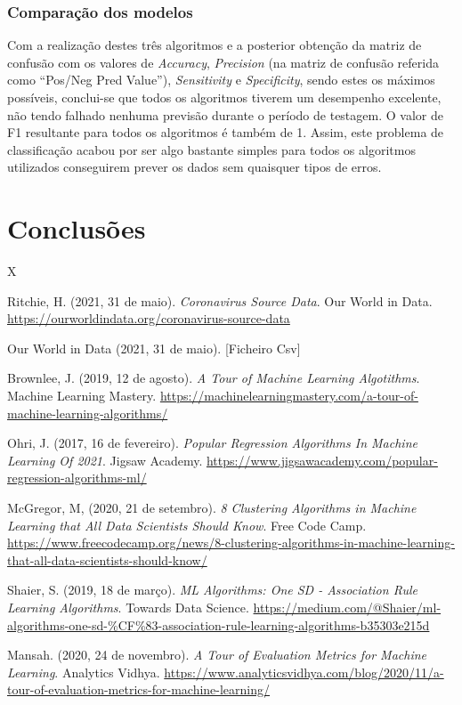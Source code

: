 \documentclass[conference]{IEEEtran}
\begin{document}
\subsubsection{Comparação dos modelos}
Com a realização destes três algoritmos e a posterior obtenção da matriz de confusão com os valores de \textit{Accuracy}, \textit{Precision} (na matriz de confusão referida como “Pos/Neg Pred Value”), \textit{Sensitivity} e \textit{Specificity}, sendo estes os máximos possíveis, conclui-se que todos os algoritmos tiverem um desempenho excelente, não tendo falhado nenhuma previsão durante o período de testagem. O valor de F1 resultante para todos os algoritmos é também de 1.
Assim, este problema de classificação acabou por ser algo bastante simples para todos os algoritmos utilizados conseguirem prever os dados sem quaisquer tipos de erros.




\section{Conclusões} %
X

\begin{thebibliography}{00}

 Ritchie, H. (2021, 31 de maio). \textit{Coronavirus Source Data}. Our World in Data. \url{https://ourworldindata.org/coronavirus-source-data}

 Our World in Data (2021, 31 de maio). [Ficheiro Csv]

 Brownlee, J. (2019, 12 de agosto). \textit{A Tour of Machine Learning Algotithms}. Machine Learning Mastery. \url{https://machinelearningmastery.com/a-tour-of-machine-learning-algorithms/}

 Ohri, J. (2017, 16 de fevereiro). \textit{Popular Regression Algorithms In Machine Learning Of 2021}. Jigsaw Academy. \url{https://www.jigsawacademy.com/popular-regression-algorithms-ml/}

 McGregor, M, (2020, 21 de setembro). \textit{8 Clustering Algorithms in Machine Learning that All Data Scientists Should Know}. Free Code Camp. \url{https://www.freecodecamp.org/news/8-clustering-algorithms-in-machine-learning-that-all-data-scientists-should-know/ }

 Shaier, S. (2019, 18 de março). \textit{ML Algorithms: One SD - Association Rule Learning Algorithms}. Towards Data Science. \url{https://medium.com/@Shaier/ml-algorithms-one-sd-%CF%83-association-rule-learning-algorithms-b35303e215d}

 Mansah. (2020, 24 de novembro). \textit{A Tour of Evaluation Metrics for Machine Learning}. Analytics Vidhya. \url{https://www.analyticsvidhya.com/blog/2020/11/a-tour-of-evaluation-metrics-for-machine-learning/}

\end{thebibliography}
\end{document}
